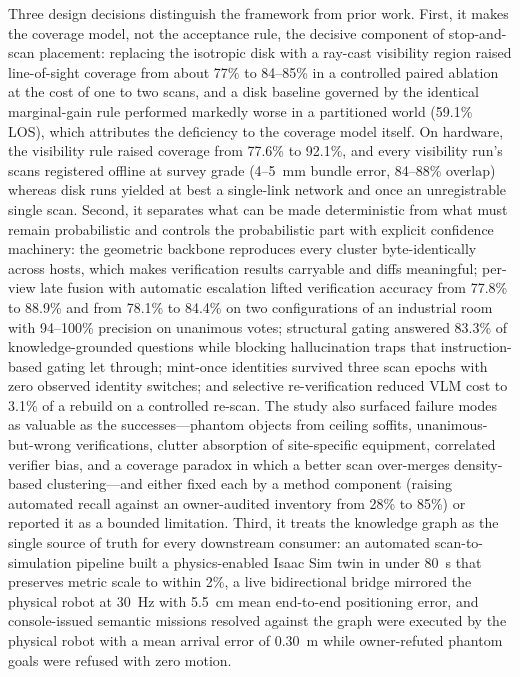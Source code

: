 Three design decisions distinguish the framework from prior work. First, it
makes the coverage model, not the acceptance rule, the decisive component of
stop-and-scan placement: replacing the isotropic disk with a ray-cast
visibility region raised line-of-sight coverage from about 77\% to 84--85\% in
a controlled paired ablation at the cost of one to two scans, and a disk
baseline governed by the identical marginal-gain rule performed markedly worse
in a partitioned world (59.1\% LOS), which attributes the deficiency to the
coverage model itself. On hardware, the visibility rule raised coverage from 77.6\% to
92.1\%, and every visibility run's scans registered offline at survey grade
(4--5~mm bundle error, 84--88\% overlap) whereas disk runs yielded at best a
single-link network and once an unregistrable single scan. Second, it
separates what can be made deterministic from what must remain probabilistic
and controls the probabilistic part with explicit confidence machinery: the
geometric backbone reproduces every cluster byte-identically across hosts,
which makes verification results carryable and diffs meaningful; per-view late
fusion with automatic escalation lifted verification accuracy from 77.8\% to
88.9\% and from 78.1\% to 84.4\% on two configurations of an industrial room
with 94--100\% precision on unanimous votes; structural gating answered 83.3\%
of knowledge-grounded questions while blocking hallucination traps that
instruction-based gating let through; mint-once identities survived three scan
epochs with zero observed identity switches; and selective re-verification
reduced VLM cost to 3.1\% of a rebuild on a controlled re-scan. The study also
surfaced failure modes as valuable as the successes---phantom objects from
ceiling soffits, unanimous-but-wrong verifications, clutter absorption of
site-specific equipment, correlated verifier bias, and a coverage paradox in
which a better scan over-merges density-based clustering---and either fixed
each by a method component (raising automated recall against an owner-audited
inventory from 28\% to 85\%) or reported it as a bounded limitation. Third, it
treats the knowledge graph as the single source of truth for every downstream
consumer: an automated scan-to-simulation pipeline built a physics-enabled
Isaac Sim twin in under 80~s that preserves metric scale to within 2\%, a live
bidirectional bridge mirrored the physical robot at 30~Hz with 5.5~cm mean
end-to-end positioning error, and console-issued semantic missions resolved
against the graph were executed by the physical robot with a mean arrival
error of 0.30~m while owner-refuted phantom goals were refused with zero
motion.


